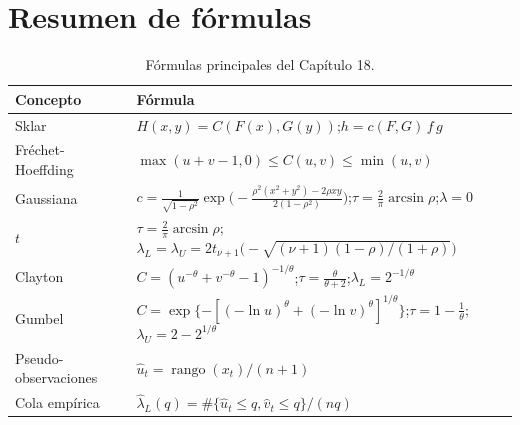 \section{Resumen de fórmulas}

\begin{table}[H]
\centering\small
\begin{tabular}{@{}ll@{}}
\toprule
Concepto & Fórmula \\
\midrule
Sklar & $H(x,y)=C(F(x),G(y))$;\quad $h=c(F,G)\,f\,g$ \\
Fréchet-Hoeffding & $\max(u+v-1,0)\le C(u,v)\le\min(u,v)$ \\
Gaussiana & $c=\frac{1}{\sqrt{1-\rho^2}}\exp\bigl(-\frac{\rho^2(x^2+y^2)-2\rho xy}{2(1-\rho^2)}\bigr)$;\quad $\tau=\frac2\pi\arcsin\rho$;\quad $\lambda=0$ \\
$t$ & $\tau=\frac2\pi\arcsin\rho$;\quad $\lambda_L=\lambda_U=2t_{\nu+1}\bigl(-\sqrt{(\nu+1)(1-\rho)/(1+\rho)}\bigr)$ \\
Clayton & $C=(u^{-\theta}+v^{-\theta}-1)^{-1/\theta}$;\quad $\tau=\frac{\theta}{\theta+2}$;\quad $\lambda_L=2^{-1/\theta}$ \\
Gumbel & $C=\exp\{-[(-\ln u)^\theta+(-\ln v)^\theta]^{1/\theta}\}$;\quad $\tau=1-\frac1\theta$;\quad $\lambda_U=2-2^{1/\theta}$ \\
Pseudo-observaciones & $\hat u_t=\operatorname{rango}(x_t)/(n+1)$ \\
Cola empírica & $\hat\lambda_L(q)=\#\{\hat u_t\le q,\hat v_t\le q\}/(nq)$ \\
\bottomrule
\end{tabular}
\caption{Fórmulas principales del Capítulo 18.}
\end{table}

